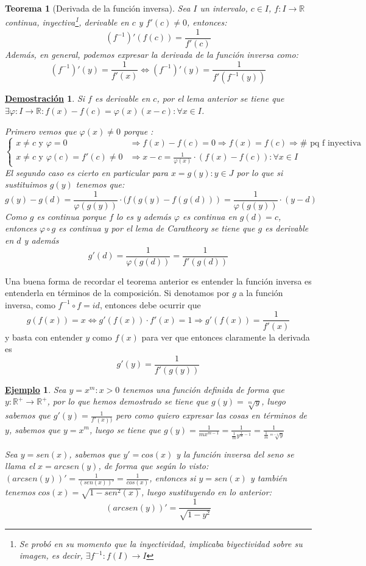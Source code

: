 \documentclass[10pt,a4paper,openright]{book}
\theoremstyle{break}
\newtheorem{theo}{Teorema}[chapter]
\newtheorem*{demo}{\underline{Demostración}}
\newtheorem{ej}{\underline{Ejemplo}}[chapter]
\begin{document}
\begin{theo}[Derivada de la función inversa]
Sea $I$ un intervalo, $c\in I$, $f:I\rightarrow \mathbb R$ continua, inyectiva\footnote{Se probó en su momento que la inyectividad, implicaba biyectividad sobre su imagen, es decir, $\exists f^{-1}: f(I)\rightarrow I$}, derivable en $c$ y $f'(c)\neq 0$, entonces:
$$(f^{-1})'(f(c))=\frac{1}{f'(c)}$$
Además, en general, podemos expresar la derivada de la función inversa como:
$$(f^{-1})'(y)=\frac{1}{f'(x)} \Leftrightarrow (f^{-1})'(y)=\frac{1}{f'(f^{-1}(y))}$$
\end{theo}
\begin{demo}
Si $f$ es derivable en $c$, por el lema anterior se tiene que $\exists \varphi: I \rightarrow\mathbb R: f(x)-f(c)=\varphi(x)(x-c): \forall x\in I$.

Primero vemos que $\varphi (x)\neq 0$ porque :
$$\begin{cases}x\neq c \mbox{ y } \varphi =0 & \Rightarrow f(x)-f(c)=0\Rightarrow f(x)=f(c)\Rightarrow \# \mbox{ pq f inyectiva}\\
x\neq c \mbox{ y } \varphi(c)= f'(c)\neq 0 &\Rightarrow x-c=\frac{1}{\varphi(x)}\cdot (f(x)-f(c)): \forall x\in I
\end{cases}$$
El segundo caso es cierto en particular para $x=g(y): y\in J$ por lo que si sustituimos $g(y)$ tenemos que:
$$g(y)-g(d)=\frac{1}{\varphi(g(y))}\cdot (f(g(y)-f(g(d)))=\frac{1}{\varphi(g(y))}\cdot (y-d)$$
Como $g$ es continua porque $f$ lo es y además $\varphi$ es continua en $g(d)=c$, entonces $\varphi\circ g$ es continua y por el lema de Caratheory se tiene que $g$ es derivable en $d$ y además
$$g'(d)=\frac{1}{\varphi(g(d))}=\frac{1}{f'(g(d))}$$
\end{demo}

Una buena forma de recordar el teorema anterior es entender la función inversa es entenderla en términos de la composición. Si denotamos por $g$ a la función inversa, como $f^{-1}\circ f = id$, entonces debe ocurrir que
\[
g(f(x))=x\Leftrightarrow g'(f(x))\cdot f'(x)=1\Rightarrow g'(f(x))=\frac{1}{f'(x)}
\]
y basta con entender $y$ como $f(x)$ para ver que entonces claramente la derivada es
\[
	g'(y)=\frac{1}{f'(g(y))}
\]

\begin{ej}
Sea $y=x^m: x>0$ tenemos una función definida de forma que $y: \mathbb R^+ \rightarrow \mathbb R^+$, por lo que hemos demostrado se tiene que $g(y)=\sqrt[m]{y}$, luego sabemos que $g'(y)=\frac{1}{f'(x))}$ pero como quiero expresar las cosas en términos de $y$, sabemos que $y=x^m$, luego se tiene que $g(y)=\frac{1}{mx^{m-1}}=\frac{1}{\frac{1}{m}y^{\frac{1}{m}-1}}=\frac{1}{\frac{1}{m}\sqrt[m-1]{y}}$

Sea $y=sen(x)$, sabemos que $y'=cos(x)$ y la función inversa del seno se llama el $x=arcsen(y)$, de forma que según lo visto: $(arcsen(y))'=\frac{1}{(sen(x))'}=\frac{1}{cos(x)}$, entonces si $y=sen(x)$ y también tenemos $cos(x)=\sqrt{1-sen^2(x)}$, luego sustituyendo en lo anterior:
$$(arcsen(y))'=\frac{1}{\sqrt{1-y^2}}$$
\end{ej}
\end{document}
